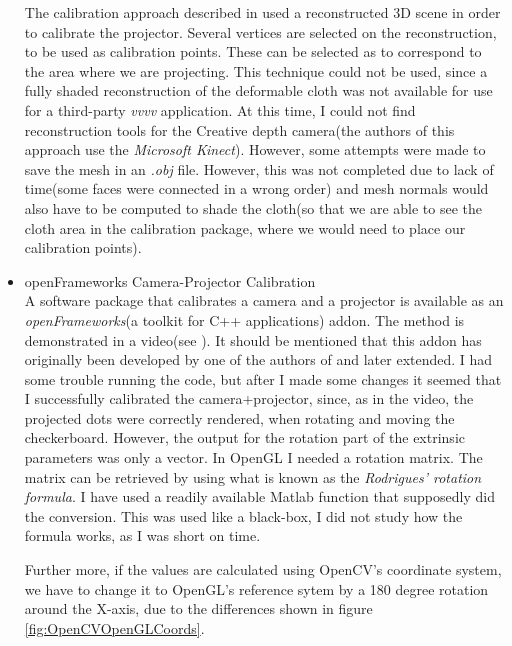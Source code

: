 \documentclass[]{article}
\begin{document}
\begin{itemize}
The calibration approach described in \cite{vvvv} used a reconstructed 3D scene in order to calibrate the projector. Several vertices are selected on the reconstruction, to be used as calibration points. These can be selected as to correspond to the area where we are projecting. This technique could not be used, since a fully shaded reconstruction of the deformable cloth was not available for use for a third-party \textit{vvvv} application. At this time, I could not find reconstruction tools for the Creative depth camera(the authors of this approach use the \textit{Microsoft Kinect}). However, some attempts were made to save the mesh in an \textit{.obj} file. However, this was not completed due to lack of time(some faces were connected in a wrong order) and mesh normals would also have to be computed to shade the cloth(so that we are able to see the cloth area in the calibration package, where we would need to place our calibration points).
\item openFrameworks Camera-Projector Calibration\\

A software package that calibrates a camera and a projector is available as an \textit{openFrameworks}(a toolkit for C++ applications) addon. The method is demonstrated in a video(see \cite{ofx}). It should be mentioned that this addon has originally been developed by one of the authors of \cite{watanabe08} and later extended. I had some trouble running the code, but after I made some changes it seemed that I successfully calibrated the camera+projector, since, as in the video, the projected dots were correctly rendered, when rotating and moving the checkerboard. However, the output for the rotation part of the extrinsic parameters was only a vector. In OpenGL I needed a rotation matrix. The matrix can be retrieved by using what is known as the \textit{Rodrigues' rotation formula}. I have used a readily available Matlab function that supposedly did the conversion. This was used like a black-box, I did not study how the formula works, as I was short on time. 

Further more, if the values are calculated using OpenCV's coordinate system, we have to change it to OpenGL's reference sytem by a 180 degree rotation around the X-axis, due to the differences shown in figure \ref{fig:OpenCVOpenGLCoords}. 


\end{itemize}
\end{document}
